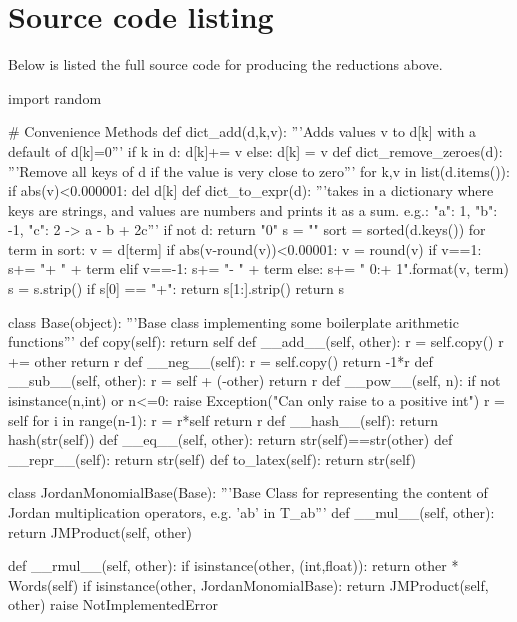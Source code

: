 \documentclass{article}
\begin{document}
\section{Source code listing}
Below is listed the full source code for producing the reductions above. 

\begin{python}
import random

# Convenience Methods
def dict_add(d,k,v):
    '''Adds values v to d[k] with a default of d[k]=0'''
    if k in d: d[k]+= v
    else: d[k] = v
def dict_remove_zeroes(d):
    '''Remove all keys of d if the value is very close to zero'''
    for k,v in list(d.items()):
        if abs(v)<0.000001:
            del d[k]
def dict_to_expr(d):
    '''takes in a dictionary where keys are strings,
    and values are numbers and prints it as a sum.
    e.g.: {"a": 1, "b": -1, "c": 2} -> a - b + 2c'''
    if not d:
        return "0"
    s = ""
    sort = sorted(d.keys())
    for term in sort:
        v = d[term]
        if abs(v-round(v))<0.00001:
            v = round(v)
        if v==1: s+= "+ " + term
        elif v==-1: s+= "- " + term
        else: s+= " {0:+} {1}".format(v, term)
    s = s.strip()
    if s[0] == "+": return s[1:].strip()
    return s


class Base(object):
    '''Base class implementing some
    boilerplate arithmetic functions'''
    def copy(self):
        return self
    def __add__(self, other):
        r = self.copy()
        r += other
        return r
    def __neg__(self):
        r = self.copy()
        return -1*r
    def __sub__(self, other):
        r = self + (-other)
        return r
    def __pow__(self, n):
        if not isinstance(n,int) or n<=0:
            raise Exception("Can only raise to a positive int")
        r = self
        for i in range(n-1):
            r = r*self
        return r
    def __hash__(self):
        return hash(str(self))
    def __eq__(self, other):
        return str(self)==str(other)
    def __repr__(self):
        return str(self)
    def to_latex(self):
        return str(self)
    

class JordanMonomialBase(Base):
    '''Base Class for representing the content of
    Jordan multiplication operators, e.g. 'ab' in T_{ab}'''
    def __mul__(self, other):
        return JMProduct(self, other)

    def __rmul__(self, other):
        if isinstance(other, (int,float)):
            return other * Words(self)
        if isinstance(other, JordanMonomialBase):
            return JMProduct(self, other)
        raise NotImplementedError


\end{python}
\end{document}
